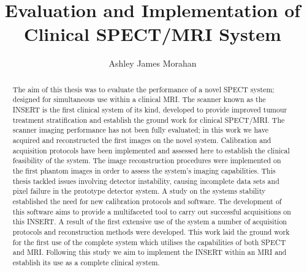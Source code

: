 
\title{Evaluation and Implementation of Clinical SPECT/MRI System}
\author{Ashley James Morahan}

\maketitle
\makedeclaration

\begin{abstract} %
The aim of this thesis was to evaluate the performance of a novel \acrshort{SPECT} system; designed for simultaneous use within a clinical \acrshort{MRI}. The scanner known as the \acrshort{INSERT} is the first clinical system of its kind, developed to provide improved tumour treatment stratification and establish the ground work for clinical \acrshort{SPECT/MRI}. The scanner imaging performance has not been fully evaluated; in this work we have acquired and reconstructed the first images on the novel system. Calibration and acquisition protocols have been implemented and assessed here to establish the clinical feasibility of the system. The image reconstruction procedures were implemented on the first phantom images in order to assess the system's imaging capabilities. This thesis tackled issues involving detector instability, causing incomplete data sets and pixel failure in the prototype detector system. A study on the systems stability established the need for new calibration protocols and software. The development of this software aims to provide a multifaceted tool to carry out successful acquisitions on this \acrshort{INSERT}. A result of the first extensive use of the system a number of acquisition protocols and reconstruction methods were developed.  This work laid the ground work for the first use of the complete system which utilises the capabilities of both \acrshort{SPECT} and \acrshort{MRI}. Following this study we aim to implement the \acrshort{INSERT} within an \acrshort{MRI} and establish its use as a complete clinical system. 
\end{abstract}




